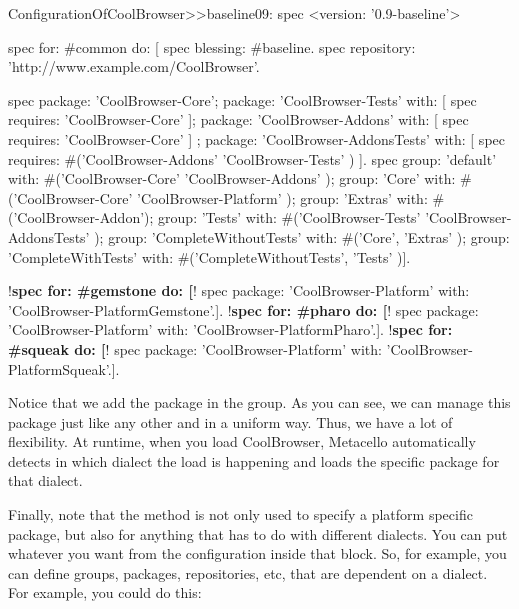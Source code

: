 \documentclass[a4paper,10pt,twoside]{book}
\begin{document}
\begin{code}{}
ConfigurationOfCoolBrowser>>baseline09: spec 
	<version: '0.9-baseline'>
	
	spec for: #common do: [
		spec blessing: #baseline.
		spec repository: 'http://www.example.com/CoolBrowser'.
		
		spec 
			package: 'CoolBrowser-Core';
			package: 'CoolBrowser-Tests' with: [ spec requires: 'CoolBrowser-Core' ];
			package: 'CoolBrowser-Addons' with: [ spec requires: 'CoolBrowser-Core' ] ;
			package: 'CoolBrowser-AddonsTests' with: [ 
				spec requires: #('CoolBrowser-Addons' 'CoolBrowser-Tests' ) ].
		spec 
			group: 'default' with: #('CoolBrowser-Core' 'CoolBrowser-Addons' );
			group: 'Core' with: #('CoolBrowser-Core' 'CoolBrowser-Platform' );
			group: 'Extras' with: #('CoolBrowser-Addon');
			group: 'Tests' with: #('CoolBrowser-Tests' 'CoolBrowser-AddonsTests' );
			group: 'CompleteWithoutTests' with: #('Core', 'Extras' );
			group: 'CompleteWithTests' with: #('CompleteWithoutTests', 'Tests' )].
			
	!\textbf{spec for: \#gemstone do: [}!
		spec package: 'CoolBrowser-Platform' with: 'CoolBrowser-PlatformGemstone'.].
	!\textbf{spec for: \#pharo do: [}!
		spec package: 'CoolBrowser-Platform' with: 'CoolBrowser-PlatformPharo'.].
	!\textbf{spec for: \#squeak do: [}!
		spec package: 'CoolBrowser-Platform' with: 'CoolBrowser-PlatformSqueak'.].
\end{code}

Notice that we add the package  in the  group. As you can see, we can manage this package just like any other and in a uniform way. Thus, we have a lot of flexibility. At runtime, when you load CoolBrowser, Metacello automatically detects in which dialect the load is happening and loads the specific package for that dialect.  	

Finally, note that the method  is not only used to specify a platform specific package, but also for anything that has to do with different dialects. You can put whatever you want from the configuration inside that block. So, for example, you can define groups, packages, repositories, etc, that are dependent on a dialect. For example, you could do this:
\end{document}
